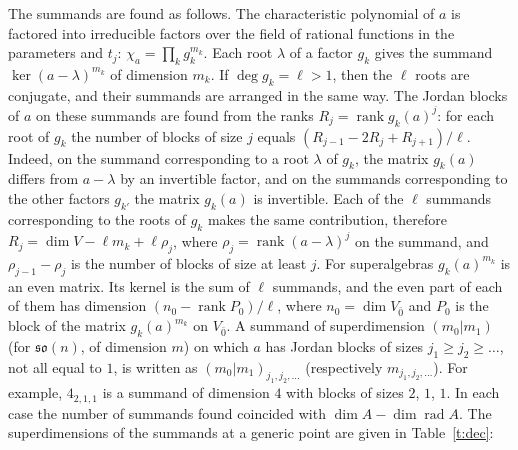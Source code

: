 \documentclass[12pt,a4paper]{article}
\newcommand{\so}{\mathfrak{so}}
\begin{document}
The summands are found as follows. The characteristic polynomial of $a$ is factored into irreducible factors over the field
of rational functions in the parameters and $t_j$: $\chi_a=\prod_kg_k^{m_k}$. Each root $\lambda$ of a factor $g_k$ gives
the summand $\ker(a-\lambda)^{m_k}$ of dimension $m_k$. If $\deg g_k=\ell>1$, then the $\ell$ roots are conjugate, and their
summands are arranged in the same way. The Jordan blocks of $a$ on these summands are found from the ranks $R_j=\operatorname{rank}g_k(a)^j$:
for each root of $g_k$ the number of blocks of size $j$ equals $(R_{j-1}-2R_j+R_{j+1})/\ell$. Indeed, on the summand
corresponding to a root $\lambda$ of $g_k$, the matrix $g_k(a)$ differs from $a-\lambda$ by an invertible factor, and on the summands corresponding to the other factors $g_{k'}$ the matrix $g_k(a)$ is invertible. Each of the $\ell$ summands
corresponding to the roots of $g_k$ makes the same contribution, therefore $R_j=\dim V-\ell m_k+\ell\rho_j$, where
$\rho_j=\operatorname{rank}(a-\lambda)^j$ on the summand, and $\rho_{j-1}-\rho_j$ is the number of blocks of size at least $j$.
For superalgebras $g_k(a)^{m_k}$ is an even matrix. Its kernel is the sum of $\ell$ summands, and the even part of each of them
has dimension $(n_0-\operatorname{rank}P_0)/\ell$, where $n_0=\dim V_{\bar0}$ and $P_0$ is the block of the matrix
$g_k(a)^{m_k}$ on $V_{\bar0}$. A summand of superdimension $(m_0|m_1)$ (for $\so(n)$, of dimension $m$) on which
$a$ has Jordan blocks of sizes $j_1\geqslant j_2\geqslant\dots$, not all equal to $1$, is written as
$(m_0|m_1)_{j_1,j_2,\dots}$ (respectively $m_{j_1,j_2,\dots}$). For example, $4_{2,1,1}$ is a summand of dimension $4$
with blocks of sizes $2$, $1$, $1$. In each case the number of summands found coincided with
$\dim A-\dim\operatorname{rad}A$. The superdimensions of the summands at a generic point are given in Table~\ref{t:dec}:
\end{document}
